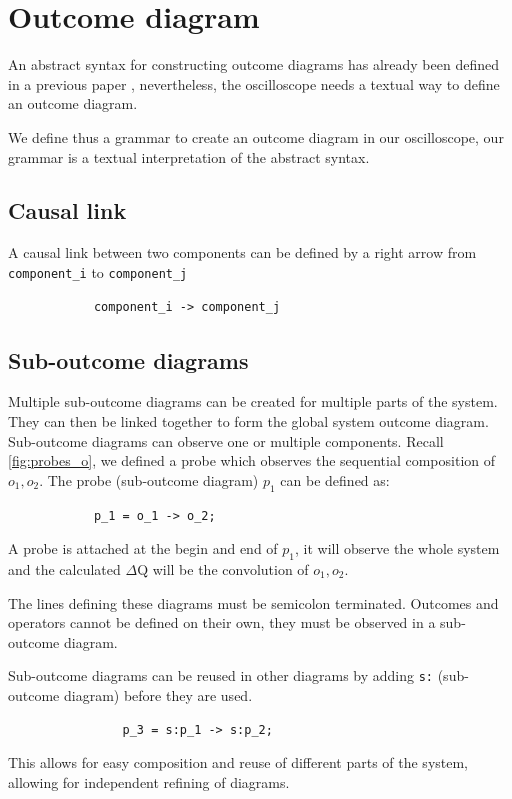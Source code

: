   \section{Outcome diagram}
        An abstract syntax for constructing outcome diagrams has already been defined in a previous paper \cite{art}, nevertheless, the oscilloscope needs a textual way to define an outcome diagram. 
       
        We define thus a grammar to create an outcome diagram in our oscilloscope, our grammar is a textual interpretation of the abstract syntax.
        
      
        \subsection{Causal link}
            A causal link between two components can be defined by a right arrow from \texttt{component\_i} to \texttt{component\_j}
        \begin{verbatim}
            component_i -> component_j 
        \end{verbatim}
        
        \subsection{Sub-outcome diagrams}
            Multiple sub-outcome diagrams can be created for multiple parts of the system. They can then be linked together to form the global system outcome diagram. Sub-outcome diagrams can observe one or multiple components.
        Recall \cref{fig:probes_o}, we defined a probe which observes the sequential composition of $o_1, o_2$. The probe (sub-outcome diagram) $p_1$ can be defined as:
        \begin{verbatim}
            p_1 = o_1 -> o_2;
        \end{verbatim}

        A probe is attached at the begin and end of $p_1$, it will observe the whole system and the calculated $\Delta$Q will be the convolution of $o_1, o_2$.

        The lines defining these diagrams must be semicolon terminated. Outcomes and operators cannot be defined on their own, they must be observed in a sub-outcome diagram.
        
        Sub-outcome diagrams can be reused in other diagrams by adding \texttt{s:} (sub-outcome diagram) before they are used.

            \begin{verbatim}
                p_3 = s:p_1 -> s:p_2;
            \end{verbatim}
            This allows for easy composition and reuse of different parts of the system, allowing for independent refining of diagrams.

